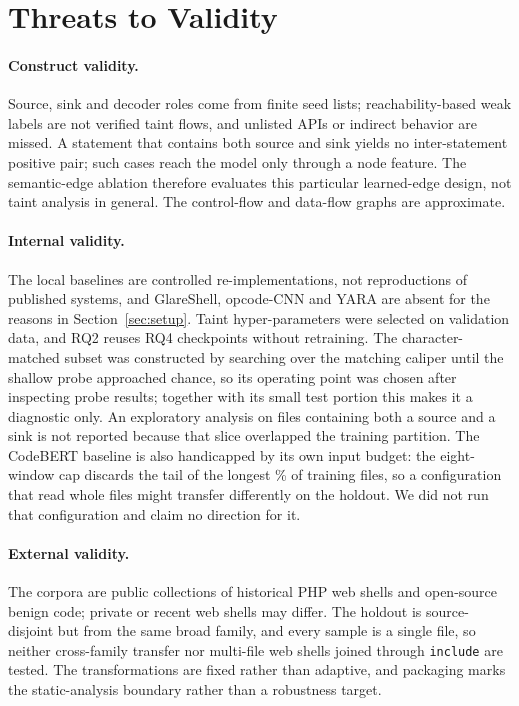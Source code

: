 \documentclass[pdflatex,sn-mathphys-num]{sn-jnl}
\begin{document}
\section{Threats to Validity}\label{sec:threats}
\paragraph{Construct validity.} Source, sink and decoder roles come from finite
seed lists; reachability-based weak labels are not verified taint flows, and
unlisted APIs or indirect behavior are missed. A statement that contains both
source and sink yields no inter-statement positive pair; such cases reach the
model only through a node feature. The semantic-edge ablation therefore
evaluates this particular learned-edge design, not taint analysis in general.
The control-flow and data-flow graphs are approximate.

\paragraph{Internal validity.} The local baselines are controlled
re-implementations, not reproductions of published systems, and GlareShell,
opcode-CNN and YARA are absent for the reasons in
Section~\ref{sec:setup}. Taint hyper-parameters were selected on validation
data, and RQ2 reuses RQ4 checkpoints without retraining. The character-matched
subset was constructed by searching over the matching caliper until the shallow
probe approached chance, so its operating point was chosen after inspecting
probe results; together with its small test portion this makes it a diagnostic
only. An exploratory analysis on files containing both a source and a sink is
not reported because that slice overlapped the training partition. The CodeBERT
baseline is also handicapped by its own input budget: the eight-window cap
discards the tail of the longest \CodeBertTruncatedTrainPct\% of training
files, so a configuration that read whole files might transfer differently on
the holdout. We did not run that configuration and claim no direction for it.

\paragraph{External validity.} The corpora are public collections of historical
PHP web shells and open-source benign code; private or recent web shells may
differ. The holdout is source-disjoint but from the same broad family, and
every sample is a single file, so neither cross-family transfer nor multi-file
web shells joined through \texttt{include} are tested. The transformations are
fixed rather than adaptive, and packaging marks the static-analysis boundary
rather than a robustness target.
\end{document}
